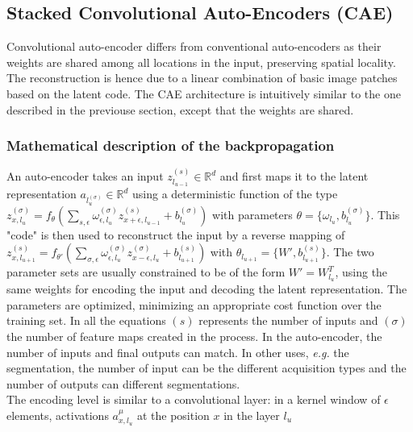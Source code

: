 \documentclass[final, paper=letter,5p,times,twocolumn]{elsarticle}
\begin{document}
\subsection{Stacked Convolutional Auto-Encoders (CAE)}

Convolutional auto-encoder differs from conventional auto-encoders as their weights are shared among all locations in the input, preserving spatial locality. The reconstruction is hence due to a linear combination of basic image patches based on the latent code. The CAE architecture is intuitively similar to the one described in the previouse section, except that the weights are shared. 


\subsubsection{Mathematical description of the backpropagation}

An auto-encoder takes an input $z_{l_{u-1}}^{(s)} \in \mathbb{R}^{d}$ and first maps it to the latent representation $a_{l_{u}^{(\sigma)}} \in \mathbb{R}^{d}$ using a deterministic function of the type $z_{x,l_{u}}^{(\sigma)} = f_{\theta}(\sum_{s,\epsilon} \omega_{\epsilon,l_{u}}^{(\sigma)}z_{x+\epsilon,l_{u-1}}^{(s)} + b_{l_{u}}^{(\sigma)})$ with parameters $\theta = \{\omega_{l_{u}}, b_{l_{u}}^{(\sigma)}\}$. This "code" is then used to reconstruct the input by a reverse mapping of $z_{x,l_{u+1}}^{(s)} = f_{\theta'}(\sum_{\sigma,\epsilon} \omega_{\epsilon,l_{u}}^{(\sigma)}z_{x-\epsilon,l_{u}}^{(\sigma)} + b_{l_{u+1}}^{(s)})$ with $\theta_{l_{u+1}} = \{W', b_{l_{u+1}}^{(s)}\}$. The two parameter sets are usually constrained to be of the form $W' = W_{l_{u}}^{T}$, using the same weights for encoding the input and decoding the latent representation. The parameters are optimized, minimizing an appropriate cost function over the training set. In all the equations $(s)$ represents the number of inputs and $(\sigma)$ the number of feature maps created in the process. In the auto-encoder, the number of inputs and final outputs can match. In other uses, {\it e.g.} the segmentation, the number of input can be the different acquisition types and the number of outputs can different segmentations.\\
The encoding level is similar to a convolutional layer: in a kernel window of $\epsilon$ elements, activations $a_{x,l_{u}}^{\mu}$ at the position $x$ in the layer $l_{u}$ 
\end{document}
